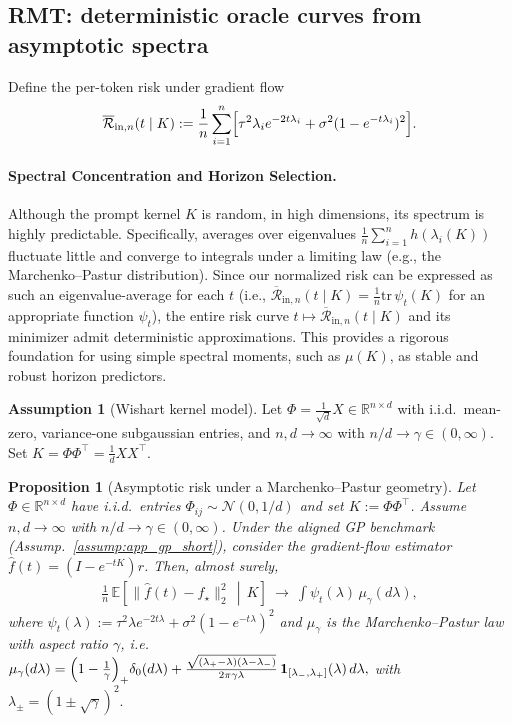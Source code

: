 \documentclass{article}
\theoremstyle{plain}
\newtheorem{proposition}[theorem]{Proposition}
\theoremstyle{definition}
\newtheorem{assumption}[theorem]{Assumption}
\theoremstyle{remark}
\begin{document}
\subsection{RMT: deterministic oracle curves from asymptotic spectra}

Define the per-token risk under gradient flow
\[
    \overline{\mathcal{R}}_{\mathrm{in},n}(t\mid K):=\frac1n\sum_{i=1}^n\Bigl[\tau^2\lambda_i e^{-2t\lambda_i}+\sigma^2(1-e^{-t\lambda_i})^2\Bigr].
\]

\paragraph{Spectral Concentration and Horizon Selection.}
Although the prompt kernel $K$ is random, in high dimensions, its spectrum is highly predictable. Specifically, averages over eigenvalues $\frac{1}{n} \sum_{i=1}^n h(\lambda_i(K))$ fluctuate little and converge to integrals under a limiting law (e.g., the Marchenko--Pastur distribution). Since our normalized risk can be expressed as such an eigenvalue-average for each $t$ (i.e., $\overline{\mathcal{R}}_{\mathrm{in},n}(t \mid K) = \frac{1}{n} \mathrm{tr} \, \psi_t(K)$ for an appropriate function $\psi_t$), the entire risk curve $t \mapsto \overline{\mathcal{R}}_{\mathrm{in},n}(t \mid K)$ and its minimizer admit deterministic approximations. This provides a rigorous foundation for using simple spectral moments, such as $\mu(K)$, as stable and robust horizon predictors.

\begin{assumption}[Wishart kernel model]\label{assump:app_wishart_short}
Let $\Phi=\frac{1}{\sqrt d}X\in\mathbb{R}^{n\times d}$ with i.i.d.\ mean-zero, variance-one subgaussian entries, and $n,d\to\infty$ with $n/d\to\gamma\in(0,\infty)$.
Set $K=\Phi\Phi^\top=\frac{1}{d}XX^\top$.
\end{assumption}


\begin{proposition}[Asymptotic risk under a Marchenko--Pastur geometry]
\label{prop:app_risk_limit_short}
Let $\Phi\in\mathbb{R}^{n\times d}$ have i.i.d.\ entries $\Phi_{ij}\sim\mathcal{N}(0,1/d)$ and set
$K:=\Phi\Phi^\top$.
Assume $n,d\to\infty$ with $n/d\to\gamma\in(0,\infty)$.
Under the aligned GP benchmark (Assump.~\ref{assump:app_gp_short}), consider the gradient-flow estimator
$\hat f(t)=(I-e^{-tK})r$.
Then, almost surely,
\begin{align}
\frac1n\,\mathbb{E}\!\left[\|\hat f(t)-f_\star\|_2^2 \,\middle|\, K\right]
\ \longrightarrow\
\int \psi_t(\lambda)\,\mu_\gamma(d\lambda),
\label{eq:app_risk_limit_mp}
\end{align}
where $\psi_t(\lambda):=\tau^2\lambda e^{-2t\lambda}+\sigma^2(1-e^{-t\lambda})^2$ and $\mu_\gamma$ is the
Marchenko--Pastur law with aspect ratio $\gamma$, i.e.
$\mu_\gamma(d\lambda)
=
\Bigl(1-\frac{1}{\gamma}\Bigr)_+\delta_0(d\lambda)
+
\frac{\sqrt{(\lambda_+-\lambda)(\lambda-\lambda_-)}}{2\pi\gamma\lambda}
\,\mathbf{1}_{[\lambda_-,\lambda_+]}(\lambda)\,d\lambda,
$ with $\lambda_\pm=(1\pm\sqrt{\gamma})^2.$
\end{proposition}
\end{document}
